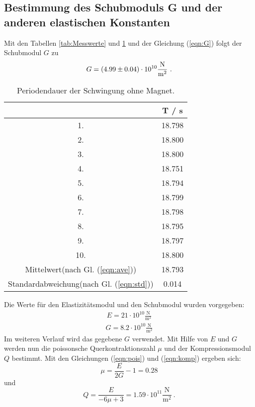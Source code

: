 \subsection{Bestimmung des Schubmoduls G und der anderen elastischen Konstanten}
Mit den Tabellen \ref{tab:Messwerte} und \ref{tab:Periodendauer1} und der Gleichung (\ref{eqn:G}) folgt der Schubmodul $G$ zu
\begin{align*}
  G = (\num{4.99 +- 0.04}) \cdot 10^{10} \frac{\text{N}}{\text{m}^2} \ .
\end{align*}

\begin{table}[H] %
  \centering
  \begin{tabular}{c c}
    \toprule
    & T / s \\
    \midrule
    1. & 18.798 \\
    2. & 18.800 \\
    3. & 18.800 \\
    4. & 18.751 \\
    5. & 18.794 \\
    6. & 18.799 \\
    7. & 18.798 \\
    8. & 18.795 \\
    9. & 18.797 \\
    10.& 18.800 \\
    \bottomrule
    Mittelwert(nach Gl. (\ref{eqn:ave})) & 18.793 \\
    Standardabweichung(nach Gl. (\ref{eqn:std})) & 0.014 \\
    \bottomrule
  \end{tabular}
  \caption{Periodendauer der Schwingung ohne Magnet.}
  \label{tab:Periodendauer1}
\end{table}

Die Werte für den Elastizitätsmodul und den Schubmodul wurden vorgegeben:
\begin{align*}
  E = 21 \cdot 10^{10} \frac{\text{N}}{\text{m}^2}
\end{align*}
\begin{align*}
  G = 8.2 \cdot 10^{10} \frac{\text{N}}{\text{m}^2}
\end{align*}
Im weiteren Verlauf wird das gegebene $G$ verwendet. Mit Hilfe von $E$ und $G$ werden nun die poissonsche Querkontraktionszahl $\mu$ und der Kompressionsmodul $Q$ bestimmt. Mit den Gleichungen (\ref{eqn:pois}) und (\ref{eqn:komp}) ergeben sich:
\begin{equation}
  \mu = \frac{E}{2G} - 1 = 0.28
\end{equation}
und
\begin{equation}
  Q = \frac{E}{-6 \mu + 3} = 1.59 \cdot 10^{11} \frac{\text{N}}{\text{m}^2} \ .
\end{equation}

